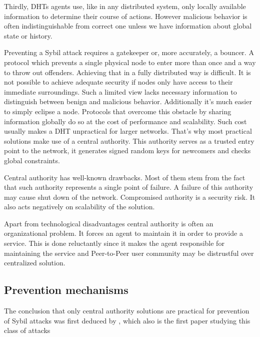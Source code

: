   Thirdly, DHTs agents use, like in any distributed system, only locally
  available information to determine their course of actions. However malicious
  behavior is often indistinguishable from correct one unless we have
  information about global state or history.

  Preventing a Sybil attack requires a gatekeeper or, more accurately, a
  bouncer. A protocol which prevents a single physical node to enter more than
  once and a way to throw out offenders. Achieving that in a fully distributed
  way is difficult. It is not possible to achieve adequate security if nodes
  only have access to their immediate surroundings. Such a limited view lacks
  necessary information to distinguish between benign and malicious behavior.
  Additionally it's much easier to simply eclipse a node. Protocols that
  overcome this obstacle by sharing information globally do so at the cost of
  performance and scalability. Such cost usually makes a DHT unpractical for
  larger networks. That's why most practical solutions make use of a central
  authority. This authority serves as a trusted entry point to the network, it
  generates signed random keys for newcomers and checks global constraints.

  Central authority has well-known drawbacks. Most of them stem from the fact
  that such authority represents a single point of failure. A failure of this
  authority may cause shut down of the network. Compromised authority is a
  security risk. It also acts negatively on scalability of the solution.
  
  Apart from technological disadvantages central authority is often an
  organizational problem. It forces an agent to maintain it in order to provide
  a service. This is done reluctantly since it makes the agent responsible for
  maintaining the service and Peer-to-Peer user community may be distrustful
  over centralized solution.

\subsection{Prevention mechanisms}

  The conclusion that only central authority solutions are practical for
  prevention of Sybil attacks was first deduced by \cite{dou02}, which also is
  the first paper studying this class of attacks \cite[p. 5]{urd11}

